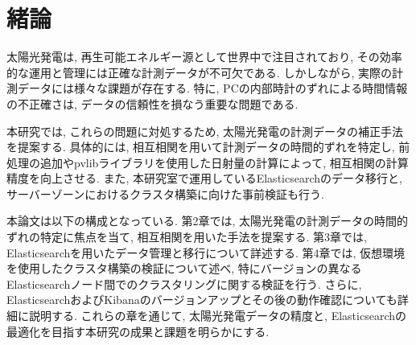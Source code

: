 \chapter{緒論}
\label{chap:first}

太陽光発電は, 再生可能エネルギー源として世界中で注目されており, その効率的な運用と管理には正確な計測データが不可欠である. しかしながら, 実際の計測データには様々な課題が存在する. 特に, PCの内部時計のずれによる時間情報の不正確さは, データの信頼性を損なう重要な問題である.

本研究では, これらの問題に対処するため, 太陽光発電の計測データの補正手法を提案する. 具体的には, 相互相関を用いて計測データの時間的ずれを特定し, 前処理の追加やpvlibライブラリを使用した日射量の計算によって, 相互相関の計算精度を向上させる. また, 本研究室で運用しているElasticsearchのデータ移行と, サーバーゾーンにおけるクラスタ構築に向けた事前検証も行う.

本論文は以下の構成となっている. 第2章では, 太陽光発電の計測データの時間的ずれの特定に焦点を当て, 相互相関を用いた手法を提案する. 第3章では, Elasticsearchを用いたデータ管理と移行について詳述する. 第4章では, 仮想環境を使用したクラスタ構築の検証について述べ, 特にバージョンの異なるElasticsearchノード間でのクラスタリングに関する検証を行う. さらに, ElasticsearchおよびKibanaのバージョンアップとその後の動作確認についても詳細に説明する. これらの章を通じて, 太陽光発電データの精度と, Elasticsearchの最適化を目指す本研究の成果と課題を明らかにする.